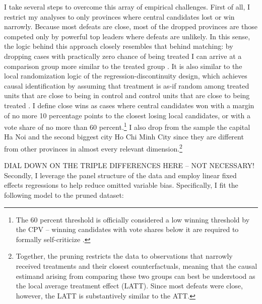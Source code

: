 \documentclass[12pt]{article}\usepackage[]{graphicx}\usepackage[]{color}
\newcommand{\1}{\mathbbm{1}}
\begin{document}
I take several steps to overcome this array of empirical challenges.  First of all, I restrict my analyses to only provinces where central candidates lost or win narrowly. Because most defeats are close, most of the dropped provinces are those competed only by powerful top leaders where defeats are unlikely. In this sense, the logic behind this approach closely resembles that behind matching: by dropping cases with practically zero chance of being treated I can arrive at a comparison group more similar to the treated group \citep{Hoetal2007Matching}. It is also similar to the local randomization logic of the regression-discontinuity design, which achieves causal identification by assuming that treatment is as-if random among treated units that are close to being in control and control units that are close to being treated \citep{CattaneoTitiunik2015}. I define close wins as cases where central candidates won with a margin of no more 10 percentage points to the closest losing local candidates, or with a vote share of no more than 60 percent.\footnote{The 60 percent threshold is officially considered a low winning threshold by the CPV – winning candidates with vote shares below it are required to formally self-criticize \citep{MaleskySchuler2011}.} I also drop from the sample the capital Ha Noi and the second biggest city Ho Chi Minh City since they are different from other provinces in almost every relevant dimension.\footnote{Together, the pruning restricts the data to observations that narrowly received treatments and their closest counterfactuals, meaning that the causal estimand arising from comparing these two groups can best be understood as the local average treatment effect (LATT). Since most defeats were close, however, the LATT is substantively similar to the ATT.}

DIAL DOWN ON THE TRIPLE DIFFERENCES HERE -- NOT NECESSARY!
Secondly, I leverage the panel structure of the data and employ linear fixed effects regressions to help reduce omitted variable bias. Specifically, I fit the following model to the pruned dataset:
\end{document}
